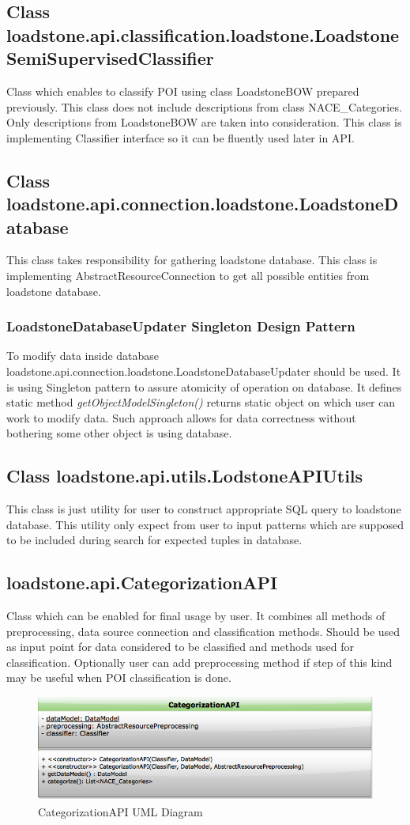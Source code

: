 \subsection{Class loadstone.api.classification.loadstone.LoadstoneSemiSupervisedClassifier}
Class which enables to classify POI using class LoadstoneBOW prepared previously. This class does not include descriptions from class NACE\_Categories. Only descriptions from LoadstoneBOW are taken into consideration. This class is implementing Classifier interface so it can be fluently used later in API.

\subsection{Class loadstone.api.connection.loadstone.LoadstoneDatabase}
This class takes responsibility for gathering loadstone database. This class is implementing AbstractResourceConnection to get all possible entities from loadstone database. 
 
\subsubsection{LoadstoneDatabaseUpdater Singleton Design Pattern}
To modify data inside database loadstone.api.connection.loadstone.LoadstoneDatabaseUpdater should be used. It is using Singleton pattern to assure atomicity of operation on database. It defines static method \textit{getObjectModelSingleton()} returns static object on which user can work to modify data. Such approach allows for data correctness without bothering some other object is using database.  

\subsection{Class loadstone.api.utils.LodstoneAPIUtils}
This class is just utility for user to construct appropriate SQL query to loadstone database. This utility only expect from user to input patterns which are supposed to be included during search for expected tuples in database. 

\subsection{loadstone.api.CategorizationAPI}
Class which can be enabled for final usage by user. It combines all methods of preprocessing, data source connection and classification methods. Should be used as input point for data considered to be classified and methods used for classification. Optionally user can add preprocessing method if step of this kind may be useful when POI classification is done.

\begin{figure}[h]
	\centering
	\includegraphics[scale=0.5]{CategorizationAPI.png}
	\caption{CategorizationAPI UML Diagram}
	\label{fig:@=CategorizationAPI}
\end{figure}